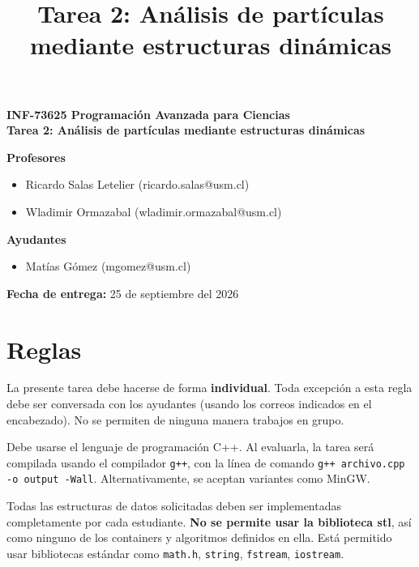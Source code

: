 \documentclass[11pt, letterpaper]{article}
\title{\textbf{Tarea 2: Análisis de partículas mediante estructuras dinámicas}}
\author{}
\date{}
\begin{document}
\begin{center}
    \vspace*{\fill}
    \LARGE \textbf{INF-73625 Programación Avanzada para Ciencias}\\
    \Large \textbf{Tarea 2: Análisis de partículas mediante estructuras dinámicas}
\end{center}

\vspace{0.5cm}

\noindent
\textbf{Profesores}
\begin{itemize}[noitemsep, topsep=0pt]
    \item Ricardo Salas Letelier (ricardo.salas@usm.cl)
    \item Wladimir Ormazabal (wladimir.ormazabal@usm.cl)
\end{itemize}

\vspace{0.3cm}
\noindent
\textbf{Ayudantes}
\begin{itemize}[noitemsep, topsep=0pt]
    \item Matías Gómez (mgomez@usm.cl)
\end{itemize}

\vspace{0.3cm}
\noindent
\textbf{Fecha de entrega:} 25 de septiembre del 2026
\vspace*{\fill}


\tableofcontents
\newpage

\section{Reglas}
La presente tarea debe hacerse de forma \textbf{individual}. Toda excepción a esta regla debe ser conversada con los ayudantes (usando los correos indicados en el encabezado). No se permiten de ninguna manera trabajos en grupo.

Debe usarse el lenguaje de programación C++. Al evaluarla, la tarea será compilada usando el compilador \texttt{g++}, con la línea de comando \texttt{g++ archivo.cpp -o output -Wall}. Alternativamente, se aceptan variantes como MinGW.

Todas las estructuras de datos solicitadas deben ser implementadas completamente por cada estudiante. \textbf{No se permite usar la biblioteca stl}, así como ninguno de los containers y algoritmos definidos en ella. Está permitido usar bibliotecas estándar como \texttt{math.h}, \texttt{string}, \texttt{fstream}, \texttt{iostream}.
\end{document}
